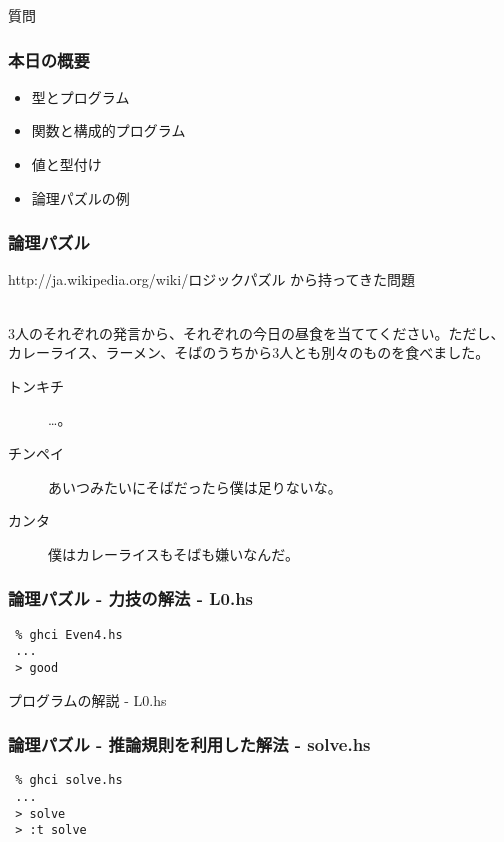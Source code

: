 \documentclass[cjk,dvipdfm,14pt]{beamer}
\begin{document}
\begin{frame}[fragile]
質問
\end{frame}

\begin{frame}[fragile]
\frametitle{本日の概要}

\begin{itemize}
\item 型とプログラム
\item 関数と構成的プログラム
\item 値と型付け
\item { \color{red} 論理パズルの例 }
\end{itemize}

\end{frame}

\begin{frame}[fragile]
\frametitle{論理パズル}

http://ja.wikipedia.org/wiki/ロジックパズル
から持ってきた問題
\\ \hrulefill \\
{ \small
3人のそれぞれの発言から、それぞれの今日の昼食を当ててください。ただし、カレーライス、ラーメン、そばのうちから3人とも別々のものを食べました。
\begin{description}
\item[トンキチ] …。
\item[チンペイ] あいつみたいにそばだったら僕は足りないな。
\item[カンタ] 僕はカレーライスもそばも嫌いなんだ。
\end{description}
}

\end{frame}

\begin{frame}[fragile]
\frametitle{論理パズル - 力技の解法 - L0.hs}

\begin{lstlisting}
 % ghci Even4.hs
 ...
 > good
\end{lstlisting}

\end{frame}

\begin{frame}[fragile]
プログラムの解説 - L0.hs
\end{frame}

\begin{frame}[fragile]
\frametitle{論理パズル - 推論規則を利用した解法 - solve.hs}

\begin{lstlisting}
 % ghci solve.hs
 ...
 > solve
 > :t solve
\end{lstlisting}

\end{frame}
\end{document}
